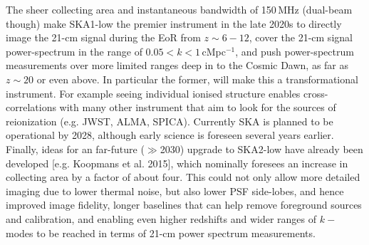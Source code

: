%
The sheer collecting area and instantaneous bandwidth of 150\,MHz (dual-beam though) make SKA1-low the premier instrument in the late 2020s to directly image the 21-cm signal during the EoR from $z\sim 6-12$, cover the 21-cm signal power-spectrum in the range of $ 0.05 < k < 1 $\,cMpc$^{-1}$, and push power-spectrum measurements over more limited ranges deep in to the Cosmic Dawn, as far as $z\sim 20$ or even above. In particular the former, will make this a transformational instrument. For example seeing individual ionised structure enables cross-correlations with many other instrument that aim to look for the sources of reionization (e.g. JWST, ALMA, SPICA). Currently SKA is planned to be operational by 2028, although early science is foreseen several years earlier.
%
Finally, ideas for an far-future ($\gg$2030) upgrade to SKA2-low have already been developed [e.g. Koopmans et al. 2015], which nominally foresees an increase in collecting area by a factor of about four. This could not only allow more detailed imaging due to lower thermal noise, but also lower PSF side-lobes, and hence improved image fidelity, longer baselines that can help remove foreground sources and calibration, and enabling even higher redshifts and wider ranges of $k-$ modes to be reached in terms of 21-cm power spectrum measurements.  




